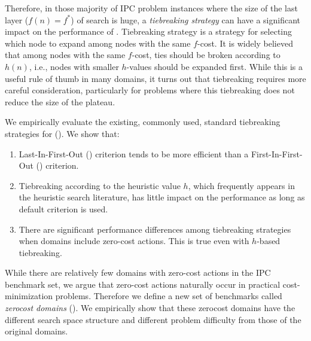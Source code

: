 Therefore, in those majority of IPC problem instances where the size of
the last layer ($f(n)=f^*$) of search is huge, a
\emph{tiebreaking strategy} can have a significant impact on the
performance of \astar. Tiebreaking strategy is a strategy 
for selecting which node to expand among nodes with the same $f$-cost.
It is widely believed that among nodes with the same $f$-cost,
ties should be broken according to $h(n)$, i.e.,
nodes with smaller $h$-values should be expanded first.  While this is a
useful rule of thumb in many domains, it turns out that tiebreaking
requires more careful consideration, particularly for problems where
this tiebreaking does not reduce the size of the plateau.

We empirically evaluate the existing, commonly used, standard
tiebreaking strategies for \astar ().
We show that:

\begin{enumerate}
 \item Last-In-First-Out (\lifo) criterion tends to be more efficient
       than a First-In-First-Out (\fifo) criterion.
 \item Tiebreaking according to the heuristic value $h$, which
       frequently appears in the heuristic search literature, has little
       impact on the performance as long as \lifo default criterion is used.
 \item There are significant performance differences among tiebreaking strategies
       when domains include zero-cost actions. This is true even with $h$-based tiebreaking.
\end{enumerate}

While there are relatively few domains with zero-cost actions in the IPC
benchmark set, we argue that zero-cost actions naturally occur in
practical cost-minimization problems. Therefore we define a new set of
benchmarks called \emph{zerocost domains}
().  We empirically show that these
zerocost domains have the different search space structure and different
problem difficulty from those of the original domains.

